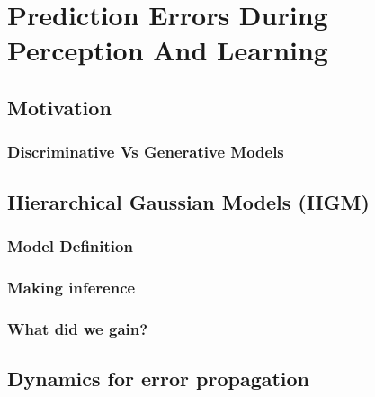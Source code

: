 \documentclass[main]{subfiles}
\begin{document}
\newpage
\section{Prediction Errors During Perception And Learning}
\subsection{Motivation}
\subsubsection{Discriminative Vs Generative Models}


\subsection{Hierarchical Gaussian Models (HGM)}
\subsubsection{Model Definition}
\subsubsection{Making inference}
\subsubsection{What did we gain?}

\subsection{Dynamics for error propagation}
\end{document}
